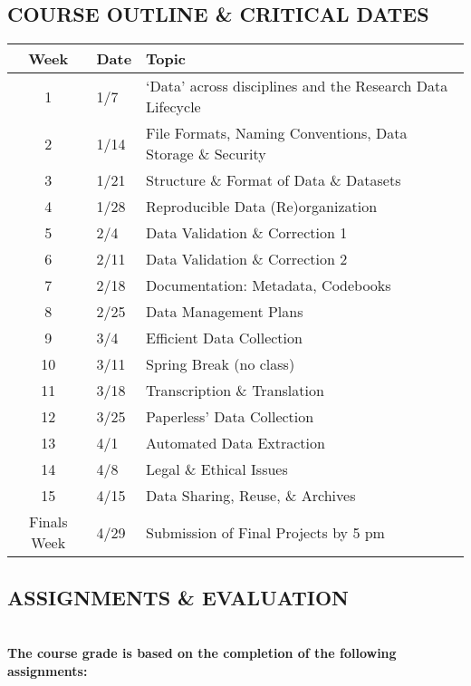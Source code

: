 \documentclass[
  12pt,
]{article}
\begin{document}
\newpage

\hypertarget{course-outline-critical-dates}{%
\subsection{COURSE OUTLINE \& CRITICAL
DATES}\label{course-outline-critical-dates}}

\begin{longtable}[]{@{}cll@{}}
\toprule
Week & Date & Topic \\
\midrule
\endhead
1 & 1/7 & `Data' across disciplines and the Research Data Lifecycle \\
2 & 1/14 & File Formats, Naming Conventions, Data Storage \& Security \\
3 & 1/21 & Structure \& Format of Data \& Datasets \\
4 & 1/28 & Reproducible Data (Re)organization \\
5 & 2/4 & Data Validation \& Correction 1 \\
6 & 2/11 & Data Validation \& Correction 2 \\
7 & 2/18 & Documentation: Metadata, Codebooks \\
8 & 2/25 & Data Management Plans \\
9 & 3/4 & Efficient Data Collection \\
10 & 3/11 & Spring Break (no class) \\
11 & 3/18 & Transcription \& Translation \\
12 & 3/25 & Paperless' Data Collection \\
13 & 4/1 & Automated Data Extraction \\
14 & 4/8 & Legal \& Ethical Issues \\
15 & 4/15 & Data Sharing, Reuse, \& Archives \\
Finals Week & 4/29 & Submission of Final Projects by 5 pm \\
\bottomrule
\end{longtable}

\hypertarget{assignments-evaluation}{%
\subsection{ASSIGNMENTS \& EVALUATION}\label{assignments-evaluation}}

~\\
\textbf{The course grade is based on the completion of the following
assignments:}
\end{document}
